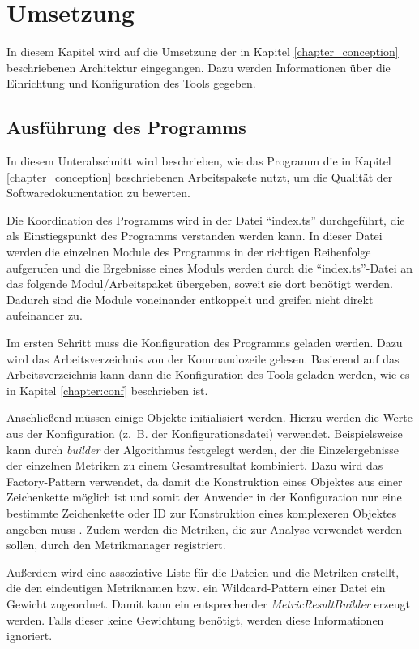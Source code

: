 
\begingroup
\renewcommand{\cleardoublepage}{} %
\renewcommand{\clearpage}{}
\chapter{Umsetzung}\label{chapter:program}
\endgroup
In diesem Kapitel wird auf die Umsetzung der in Kapitel \ref{chapter_conception} beschriebenen Architektur eingegangen. Dazu werden Informationen über die Einrichtung und Konfiguration des Tools gegeben.
\section{Ausführung des Programms}
In diesem Unterabschnitt wird beschrieben, wie das Programm die in Kapitel \ref{chapter_conception}
beschriebenen Arbeitspakete nutzt, um die Qualität der Softwaredokumentation zu bewerten. 

Die Koordination des Programms wird in der Datei \enquote{index.ts} durchgeführt, die als Einstiegspunkt des Programms verstanden werden kann. In dieser Datei werden die einzelnen Module des Programms in der richtigen Reihenfolge aufgerufen und die Ergebnisse eines Moduls werden durch die \enquote{index.ts}-Datei an das folgende Modul/Arbeitspaket übergeben, soweit sie dort benötigt werden. Dadurch sind die Module voneinander entkoppelt und greifen nicht direkt aufeinander zu. 

Im ersten Schritt  muss die Konfiguration des Programms geladen werden. Dazu wird das Arbeitsverzeichnis von der Kommandozeile gelesen. Basierend auf das Arbeitsverzeichnis kann dann die Konfiguration des Tools geladen werden, wie es in Kapitel \ref{chapter:conf} beschrieben ist.  

Anschließend müssen einige Objekte  initialisiert werden. Hierzu werden die Werte aus der Konfiguration (z.~B. der Konfigurationsdatei) verwendet. Beispielsweise kann durch \textit{builder} der Algorithmus festgelegt werden, der die Einzelergebnisse der einzelnen Metriken zu einem Gesamtresultat kombiniert. Dazu wird das Factory-Pattern verwendet, da damit die Konstruktion eines Objektes aus einer Zeichenkette möglich ist und somit der Anwender in der Konfiguration nur eine bestimmte Zeichenkette oder ID zur Konstruktion eines komplexeren Objektes angeben muss \cite[S. 149-161]{gamma2015design}. Zudem werden die Metriken, die zur Analyse verwendet werden sollen, durch den Metrikmanager registriert.

Außerdem wird eine assoziative Liste für die Dateien und die Metriken erstellt, die den eindeutigen Metriknamen bzw. ein Wildcard-Pattern einer Datei ein Gewicht zugeordnet. Damit kann ein entsprechender \textit{MetricResultBuilder} erzeugt werden. Falls dieser keine Gewichtung benötigt, werden diese Informationen ignoriert. 

